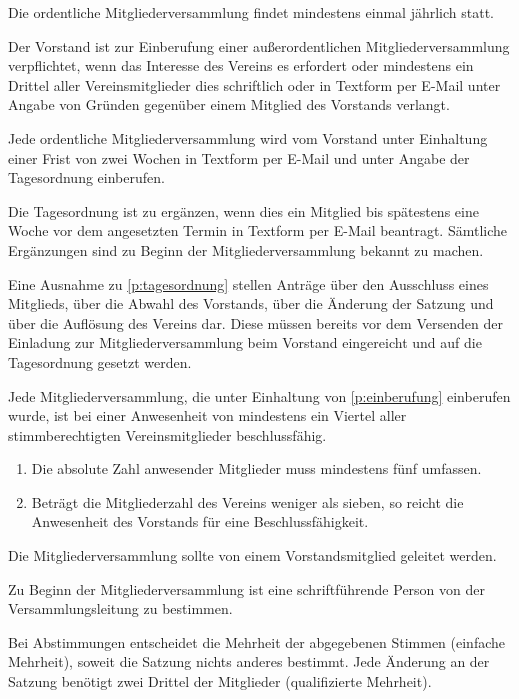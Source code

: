 \documentclass[%
    parskip=half,
]{scrartcl}
\begin{document}
\begin{contract}
		Die ordentliche Mitgliederversammlung findet mindestens einmal jährlich statt.
		
		Der Vorstand ist zur Einberufung einer außerordentlichen Mitgliederversammlung verpflichtet, wenn das Interesse des Vereins es erfordert oder mindestens ein Drittel aller Vereinsmitglieder dies schriftlich oder in Textform per E-Mail unter Angabe von Gründen gegenüber einem Mitglied des Vorstands verlangt.
		\label{p:einberufung}
				
		Jede ordentliche Mitgliederversammlung wird vom Vorstand unter Einhaltung einer Frist von zwei Wochen in Textform per E-Mail und unter Angabe der Tagesordnung einberufen.
		
		Die Tagesordnung ist zu ergänzen, wenn dies ein Mitglied bis spätestens eine Woche vor dem angesetzten Termin in Textform per E-Mail beantragt. Sämtliche Ergänzungen sind zu Beginn der Mitgliederversammlung bekannt zu machen.
		\label{p:tagesordnung}
		
		Eine Ausnahme zu \ref{p:tagesordnung} stellen Anträge über den Ausschluss eines Mitglieds, über die Abwahl des Vorstands, über die Änderung der Satzung und über die Auflösung des Vereins dar. Diese müssen bereits vor dem Versenden der Einladung zur Mitgliederversammlung beim Vorstand eingereicht und auf die Tagesordnung gesetzt werden.
		
		Jede Mitgliederversammlung, die unter Einhaltung von \ref{p:einberufung} einberufen wurde, ist bei einer Anwesenheit von mindestens ein Viertel aller stimmberechtigten Vereinsmitglieder beschlussfähig.
		
		\begin{enumerate}[\qquad a)]
			\item Die absolute Zahl anwesender Mitglieder muss mindestens fünf umfassen.
			\item Beträgt die Mitgliederzahl des Vereins weniger als sieben, so reicht die Anwesenheit des Vorstands für eine Beschlussfähigkeit.
		\end{enumerate}
		
		Die Mitgliederversammlung sollte von einem Vorstandsmitglied geleitet werden.
		
		Zu Beginn der Mitgliederversammlung ist eine schriftführende Person von der Versammlungsleitung zu bestimmen.
		
		Bei Abstimmungen entscheidet die Mehrheit der abgegebenen Stimmen (einfache Mehrheit), soweit die Satzung nichts anderes bestimmt. Jede Änderung an der Satzung benötigt zwei Drittel der Mitglieder (qualifizierte Mehrheit).
		

\end{contract}
\end{document}
